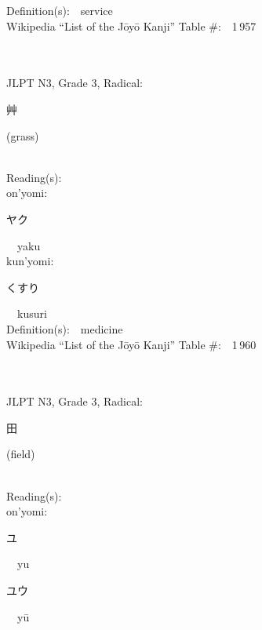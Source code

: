 \begin{multicols}{2}
Definition(s):\ \ service \\
Wikipedia ``List of the J\=oy\=o Kanji'' Table \#:\ \ 1\,957 \\
\ \ \\
{\fontsize{34pt}{40pt}  }\ \ \\  %
{JLPT N3, Grade 3, Radical:\ \ {\begin{CJK}{UTF8}{min} 艸 \end{CJK}} (grass) } \\
Reading(s):\ \ \\
{\hspace*{1em}}on'yomi:\ \ \\
{\hspace*{2em}}{\begin{CJK}{UTF8}{min} ヤク \end{CJK}}\ \ yaku\ \ \\
{\hspace*{1em}}kun'yomi:\ \ \\
{\hspace*{2em}}{\begin{CJK}{UTF8}{min} くすり \end{CJK}}\ \ kusuri\ \ \\
Definition(s):\ \ medicine \\
Wikipedia ``List of the J\=oy\=o Kanji'' Table \#:\ \ 1\,960 \\
\ \ \\
{\fontsize{34pt}{40pt}  }\ \ \\  %
{JLPT N3, Grade 3, Radical:\ \ {\begin{CJK}{UTF8}{min} 田 \end{CJK}} (field) } \\
Reading(s):\ \ \\
{\hspace*{1em}}on'yomi:\ \ \\
{\hspace*{2em}}{\begin{CJK}{UTF8}{min} ユ \end{CJK}}\ \ yu\ \ \\
{\hspace*{2em}}{\begin{CJK}{UTF8}{min} ユウ \end{CJK}}\ \ y\=u\ \ \\

\end{multicols}
